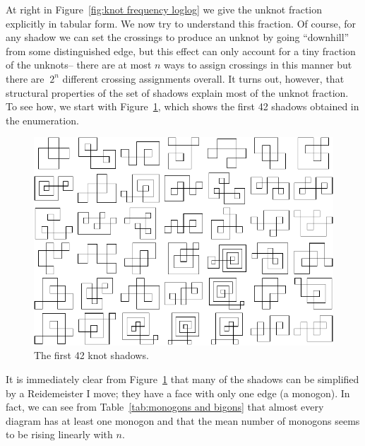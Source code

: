 \documentclass[amsmath,secnumarabic,floatfix,amssymb,nofootinbib,nobibnotes,letterpaper,11pt,tightenlines,showkeys]{revtex4}
\theoremstyle{definition}
\let\mgp=\marginpar \marginparwidth18mm \marginparsep1mm
\def\marginpar#1{\mgp{\raggedright\tiny #1}}
\let\lbl=\label
\def\label#1{\lbl{#1}\ifinner\else\marginpar{\ref{#1} #1}\ignorespaces\fi}
\begin{document}
At right in Figure~\ref{fig:knot frequency loglog} we give the unknot fraction explicitly in tabular form. We now try to understand this fraction. Of course, for any shadow we can set the crossings to produce an unknot by going ``downhill'' from some distinguished edge, but this effect can only account for a tiny fraction of the unknots-- there are at most $n$ ways to assign crossings in this manner but there are $~2^n$ different crossing assignments overall. It turns out, however, that structural properties of the set of shadows explain most of the unknot fraction. To see how, we start with Figure~\ref{fig:knot grid}, which shows the first 42 shadows obtained in the enumeration.
\begin{figure}
\includegraphics[width=6in]{knotgrid.pdf}
\caption{The first 42 knot shadows.}
\label{fig:knot grid}
\end{figure}
It is immediately clear from Figure~\ref{fig:knot grid} that many of the shadows can be simplified by a Reidemeister I move; they have a face with only one edge (a monogon). In fact, we can see from Table~\ref{tab:monogons and bigons} that almost every diagram has at least one monogon and that the mean number of monogons seems to be rising linearly with $n$.  
\end{document}

